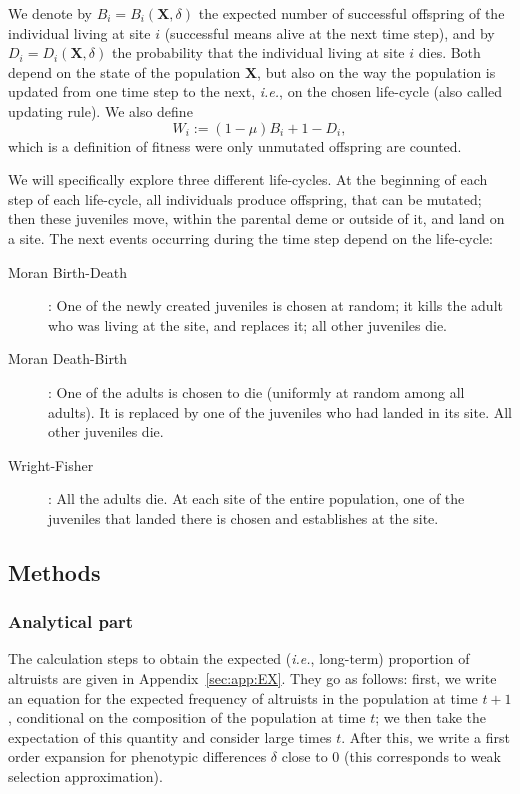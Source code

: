 \documentclass[11pt, letterpaper]{article}
\newcommand{\ie}{\textit{i.e.}}
\newcommand{\appname}[0]{Appendix}
\newcommand{\selstr}{\delta}
\begin{document}
We denote by $B_i = B_i(\mathbf{X}, \selstr)$ the expected number of successful offspring of the individual living at site $i$ (successful means alive at the next time step), and by $D_i = D_i(\mathbf{X}, \selstr)$ the probability that the individual living at site $i$ dies. Both depend on the state of the population $\mathbf{X}$, but also on the way the population is updated from one time step to the next, \ie, on the chosen life-cycle (also called updating rule). We also define
%
\begin{equation}\label{eq:defW}
W_i := (1-\mu) B_i + 1 - D_i,
\end{equation}
which is a definition of fitness were only unmutated offspring are counted.

We will specifically explore three different life-cycles. At the beginning of each step of each life-cycle, all individuals produce offspring, that can be mutated; then these juveniles move, within the parental deme or outside of it, and land on a site. The next events occurring during the time step depend on the life-cycle:
\begin{description}
\item[Moran Birth-Death]: One of the newly created juveniles is chosen at random; it kills the adult who was living at the site, and replaces it; all other juveniles die. 
\item[Moran Death-Birth]: One of the adults is chosen to die (uniformly at random among all adults). It is replaced by one of the juveniles who had landed in its site. All other juveniles die. 
\item[Wright-Fisher]: All the adults die. At each site of the entire population, one of the juveniles that landed there is chosen and establishes at the site. 
\end{description}
  
\subsection{Methods}
\subsubsection{Analytical part}

The calculation steps to obtain the expected (\ie, long-term) proportion of altruists are given in \appname~\ref{sec:app:EX}. They go as follows: first, we write an equation for the expected frequency of altruists in the population at time $t+1$, conditional on the composition of the population at time $t$; we then take the expectation of this quantity and consider large times $t$. After this, we write a first order expansion for phenotypic differences $\selstr$ close to $0$ (this corresponds to weak selection approximation). 
\end{document}
